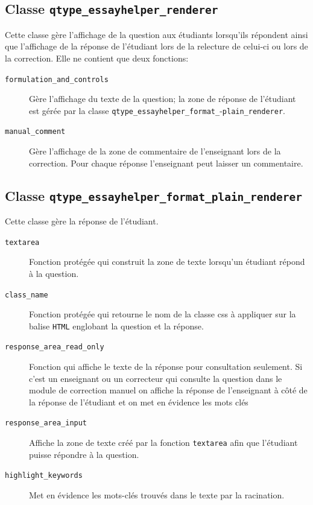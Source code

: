 \subsection*{Classe \texttt{qtype\_essayhelper\_renderer}}
Cette classe g\`ere l'affichage de la question aux \'etudiants lorsqu'ils r\'epondent ainsi que l'affichage de la r\'eponse de l'\'etudiant lors de la relecture de celui-ci ou lors de la correction.
Elle ne contient que deux fonctions:
\begin{description}
  \item[\texttt{formulation\_and\_controls}] G\`ere l'affichage du texte de la question; la zone de r\'eponse de l'\'etudiant est g\'er\'ee par la classe \texttt{qtype\_essayhelper\_format\_}-\texttt{plain\_renderer}.
  \item[\texttt{manual\_comment}] G\`ere l'affichage de la zone de commentaire de l'enseignant lors de la correction. Pour chaque r\'eponse l'enseignant peut laisser un commentaire.
\end{description}

\subsection*{Classe \texttt{qtype\_essayhelper\_format\_plain\_renderer}}
Cette classe g\`ere la r\'eponse de l'\'etudiant.
\begin{description}
  \item[\texttt{textarea}] Fonction prot\'eg\'ee qui construit la zone de texte lorsqu'un \'etudiant r\'epond \`a la question.
  \item[\texttt{class\_name}] Fonction prot\'eg\'ee qui retourne le nom de la classe css \`a appliquer sur la balise \texttt{HTML} englobant la question et la r\'eponse.
  \item[\texttt{response\_area\_read\_only}] Fonction qui affiche le texte de la r\'eponse pour consultation seulement. Si c'est un enseignant ou un correcteur qui consulte la question dans le module de correction manuel on affiche la r\'eponse de l'enseignant \`a c\^ot\'e de la r\'eponse de l'\'etudiant et on met en \'evidence les mots cl\'es
  \item[\texttt{response\_area\_input}] Affiche la zone de texte cr\'e\'e par la fonction \texttt{textarea} afin que l'\'etudiant puisse r\'epondre \`a la question.
  \item[\texttt{highlight\_keywords}] Met en \'evidence les mots-cl\'es trouv\'es dans le texte par la racination.
\end{description}

